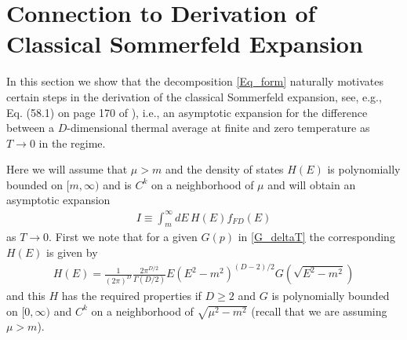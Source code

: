 \documentclass[sn-mathphys,Numbered]{sn-jnl}
\newcommand*{\xgreen}{\color{green}}
\begin{document}





\appendix



\section{Connection to Derivation of Classical Sommerfeld Expansion}
In this section we show that the decomposition \eqref{Eq_form} naturally motivates certain steps in the derivation of the classical Sommerfeld expansion, see, e.g., Eq. (58.1) on page 170 of \cite{landau2013statistical}), i.e., an  asymptotic expansion for the difference between a $D$-dimensional thermal average at finite and zero temperature as $T\to 0$ in the regime.  


Here we will assume that $\mu>m$ and the density of states $H(E)$ is  polynomially bounded on $[m,\infty)$ and is $C^k$ on a neighborhood of $\mu$ and will obtain an asymptotic expansion 
\begin{align}
    I\equiv\int_m^\infty dE\, H(E) f_{FD}(E)
\end{align}
as $T\to 0$.  First we note that for a given $G(p)$ in \eqref{G_deltaT} the corresponding $H(E)$ is given by
\begin{align}
   H(E)= \frac{1}{(2\pi)^D}\frac{2\pi^{D/2}}{\Gamma(D/2)} E(E^2-m^2)^{(D-2)/2} G(\sqrt{E^2-m^2}) 
\end{align}
and this $H$ has the required properties if $D\geq 2$ and $G$ is polynomially bounded on $[0,\infty)$ and $C^k$ on a neighborhood of $\sqrt{\mu^2-m^2}$ (recall that we are assuming $\mu>m$).
\end{document}
